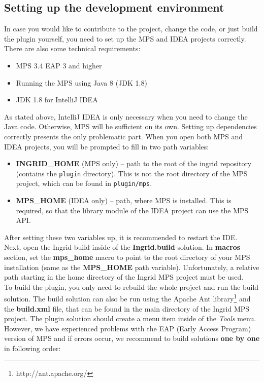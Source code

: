 \subsection{Setting up the development environment}
\label{chap:dev_env}

In case you would like to contribute to the project, change the code, or just build the plugin yourself, you need to set up the MPS and IDEA projects correctly.
There are also some technical requirements:

\begin{itemize}
	\item MPS 3.4 EAP 3 and higher
	\item Running the MPS using Java 8 (JDK 1.8)
	\item JDK 1.8 for IntelliJ IDEA
\end{itemize}

As stated above, IntelliJ IDEA is only necessary when you need to change the Java code.
Otherwise, MPS will be sufficient on its own.
Setting up dependencies correctly presents the only problematic part.
When you open both MPS and IDEA projects, you will be prompted to fill in two path variables:

\begin{itemize}
	\item \textbf{INGRID{\_}HOME} (MPS only) -- path to the root of the ingrid repository (contains the \texttt{plugin} directory). This is not the root directory of the MPS project, which can be found in \texttt{plugin/mps}.
	
	\item \textbf{MPS{\_}HOME} (IDEA only) -- path, where MPS is installed. This is required, so that the library module of the IDEA project can use the MPS API.
\end{itemize}

After setting these two variables up, it is recommended to restart the IDE.
\\

Next, open the Ingrid build inside of the \textbf{Ingrid.build} solution. In \textbf{macros} section, set the \textbf{mps{\_}home} macro to point to the root directory of your MPS installation (same as the \textbf{MPS{\_}HOME} path variable).
Unfortunately, a relative path starting in the home directory of the Ingrid MPS project must be used.
\\

To build the plugin, you only need to rebuild the whole project and run the build solution.
The build solution can also be run using the Apache Ant library\footnote{http://ant.apache.org/} and the \textbf{build.xml} file, that can be found in the main directory of the Ingrid MPS project.
The plugin solution should create a menu item inside of the \textit{Tools} menu.
However, we have experienced problems with the EAP (Early Access Program) version of MPS and if errors occur, we recommend to build solutions \textbf{one by one} in following order:

